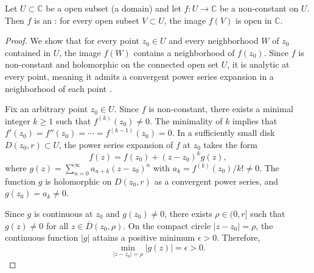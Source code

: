 \begin{theorem} \label{theorem:the_open_mapping_theorem_stating_that_every_non_constant_holomorphic_function_on_a_connected_open_subset_of_the_complex_plane_is_an_open_map}
Let $U \subset \mathbb{C}$ be a  open subset (a domain) and let $f : U \to \mathbb{C}$ be a non-constant  on $U$.
Then $f$ is an : for every open subset $V \subset U$, the image $f(V)$ is open in $\mathbb{C}$.
\end{theorem}

\begin{proof}
We show that for every point $z_0 \in U$ and every neighborhood $W$ of $z_0$ contained in $U$, the image $f(W)$ contains a neighborhood of $f(z_0)$. Since $f$ is non-constant and holomorphic on the connected open set $U$, it is analytic at every point, meaning it admits a convergent power series expansion in a neighborhood of each point .

Fix an arbitrary point $z_0 \in U$. Since $f$ is non-constant, there exists a minimal integer $k \geq 1$ such that $f^{(k)}(z_0) \neq 0$. The minimality of $k$ implies that $f'(z_0) = f''(z_0) = \cdots = f^{(k-1)}(z_0) = 0$. In a sufficiently small disk $D(z_0, r) \subset U$, the power series expansion of $f$ at $z_0$ takes the form
$$f(z) = f(z_0) + (z - z_0)^k g(z),$$
where $g(z) = \sum_{n=0}^\infty a_{n+k}(z - z_0)^n$ with $a_k = f^{(k)}(z_0)/k! \neq 0$. The function $g$ is holomorphic on $D(z_0, r)$ as a convergent power series, and $g(z_0) = a_k \neq 0$.

Since $g$ is continuous at $z_0$ and $g(z_0) \neq 0$, there exists $\rho \in (0, r]$ such that $g(z) \neq 0$ for all $z \in \overline{D}(z_0, \rho)$. On the compact circle $|z - z_0| = \rho$, the continuous function $|g|$ attains a positive minimum $\epsilon > 0$. Therefore,
$$\min_{|z-z_0|=\rho} |g(z)| = \epsilon > 0.$$


\end{proof}
